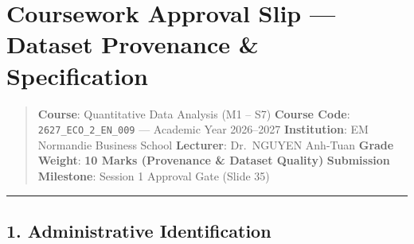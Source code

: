 \documentclass[
]{article}
\author{}
\date{}
\begin{document}
\section{Coursework Approval Slip --- Dataset Provenance \&
Specification}\label{coursework-approval-slip-dataset-provenance-specification}

\begin{quote}
\textbf{Course}: Quantitative Data Analysis (M1 -- S7) \textbf{Course
Code}: \texttt{2627\_ECO\_2\_EN\_009} --- Academic Year 2026--2027
\textbf{Institution}: EM Normandie Business School \textbf{Lecturer}:
Dr.~NGUYEN Anh-Tuan \textbf{Grade Weight}: \textbf{10 Marks (Provenance
\& Dataset Quality)} \textbf{Submission Milestone}: Session 1 Approval
Gate (Slide 35)
\end{quote}

\begin{center}\rule{0.5\linewidth}{0.5pt}\end{center}

\subsection{1. Administrative
Identification}\label{administrative-identification}
\end{document}
